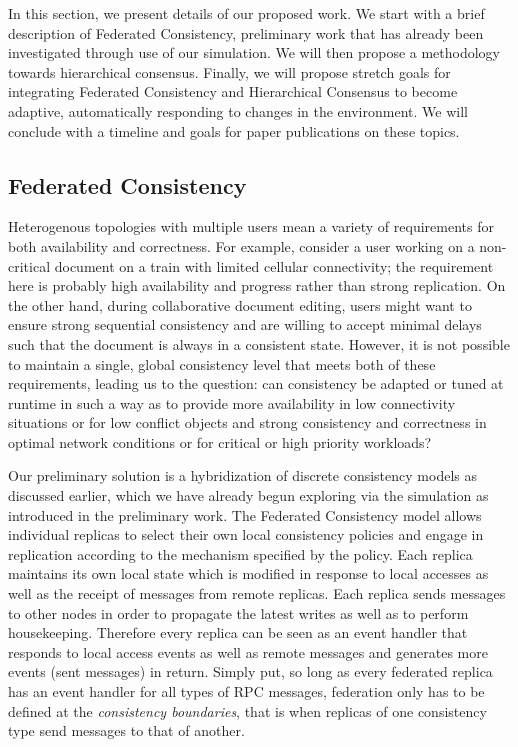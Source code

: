 \documentclass{article}
\begin{document}
In this section, we present details of our proposed work. We start with a brief description of Federated Consistency, preliminary work that has already been investigated through use of our simulation. We will then propose a methodology towards hierarchical consensus. Finally, we will propose stretch goals for integrating Federated Consistency and Hierarchical Consensus to become adaptive, automatically responding to changes in the environment. We will conclude with a timeline and goals for paper publications on these topics.

\subsection{Federated Consistency}

Heterogenous topologies with multiple users mean a variety of requirements for both availability and correctness. For example, consider a user working on a non-critical document on a train with limited cellular connectivity; the requirement here is probably high availability and progress rather than strong replication. On the other hand, during collaborative document editing, users might want to ensure strong sequential consistency and are willing to accept minimal delays such that the document is always in a consistent state. However, it is not possible to maintain a single, global consistency level that meets both of these requirements, leading us to the question: can consistency be adapted or tuned at runtime in such a way as to provide more availability in low connectivity situations or for low conflict objects and strong consistency and correctness in optimal network conditions or for critical or high priority workloads?

Our preliminary solution is a hybridization of discrete consistency models as discussed earlier, which we have already begun exploring via the simulation as introduced in the preliminary work. The Federated Consistency model allows individual replicas to select their own local consistency policies and engage in replication according to the mechanism specified by the policy. Each replica maintains its own local state which is modified in response to local accesses as well as the receipt of messages from remote replicas. Each replica sends messages to other nodes in order to propagate the latest writes as well as to perform housekeeping. Therefore every replica can be seen as an event handler that responds to local access events as well as remote messages and generates more events (sent messages) in return. Simply put, so long as every federated replica has an event handler for all types of RPC messages, federation only has to be defined at the \textit{consistency boundaries}, that is when replicas of one consistency type send messages to that of another.
\end{document}
